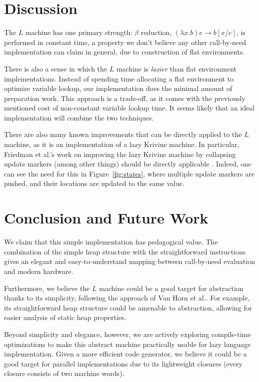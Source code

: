 \documentclass[preprint]{sigplanconf}
\begin{document}


\section{Discussion}
The $L$ machine has one primary strength: $\beta$ reduction, $(\lambda x.b) e
\rightarrow b[x/e]$, is performed in constant time, a property we don't believe
any other call-by-need implementation can claim in general, due to construction
of flat environments.

There is also a sense in which the $L$ machine is \emph{lazier} than flat
environment implementations. Instead of spending time allocating a flat
environment to optimize variable lookup, our implementation does the minimal
amount of preparation work. This approach is a trade-off, as it comes with the
previously mentioned cost of non-constant variable lookup time. It seems likely
that an ideal implementation will combine the two techniques. 

There are also many known improvements that can be directly applied to the $L$
machine, as it is an implementation of a lazy Krivine machine. In particular,
Friedman et al.'s work on improving the lazy Krivine machine by collapsing
update markers (among other things) should be directly applicable \cite{lkm}.
Indeed, one can see the need for this in Figure~\ref{fig:states}, where multiple
update markers are pushed, and their locations are updated to the same value.

\section{Conclusion and Future Work}
We claim that this simple implementation has pedagogical value. The combination
of the simple heap structure with the straightforward instructions gives an
elegant and easy-to-understand mapping between call-by-need evaluation and
modern hardware.

Furthermore, we believe the $L$ machine could be a good target for abstraction
thanks to its simplicity, following the approach of Van Horn et
al.\cite{van2010abstracting}. For example, its straightforward heap structure
could be amenable to abstraction, allowing for easier analysis of static heap
properties.

Beyond simplicity and elegance, however, we are actively exploring compile-time
optimizations to make this abstract machine practically usable for lazy language
implementation. Given a more efficient code generator, we believe it could be a
good target for parallel implementations due to its lightweight closures (every
closure consists of two machine words).



\end{document}

